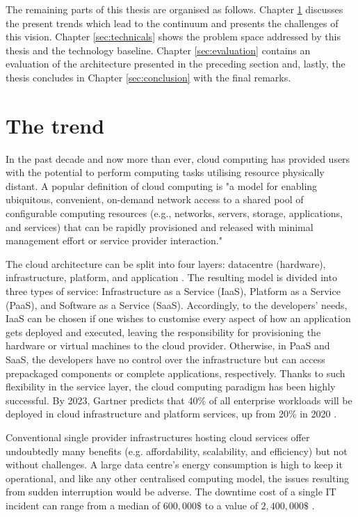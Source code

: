 The remaining parts of this thesis are organised as follows. Chapter \ref{sec:challenges} discusses the present trends which lead to the continuum and presents the challenges of this vision. Chapter \ref{sec:technicals} shows the problem space addressed by this thesis and the technology baseline. Chapter \ref{sec:evaluation} contains an evaluation of the architecture presented in the preceding section and, lastly, the thesis concludes in Chapter \ref{sec:conclusion} with the final remarks.

\section{The trend}
\label{sec:challenges}

In the past decade and now more than ever, cloud computing has provided users with the potential to perform computing tasks utilising resource physically distant. A popular definition of cloud computing \cite{cloud-def} is "a model for enabling ubiquitous, convenient, on-demand network access to a shared pool of configurable computing resources (e.g., networks, servers, storage, applications, and services) that can be rapidly provisioned and released with minimal management effort or service provider interaction."

The cloud architecture can be split into four layers: datacentre (hardware), infrastructure, platform, and application \cite{cloud-computing}. The resulting model is divided into three types of service: Infrastructure as a Service (IaaS), Platform as a Service (PaaS), and Software as a Service (SaaS). Accordingly, to the developers' needs, IaaS can be chosen if one wishes to customise every aspect of how an application gets deployed and executed, leaving the responsibility for provisioning the hardware or virtual machines to the cloud provider. Otherwise, in PaaS and SaaS, the developers have no control over the infrastructure but can access prepackaged components or complete applications, respectively. Thanks to such flexibility in the service layer, the cloud computing paradigm has been highly successful. By 2023, Gartner predicts that 40\% of all enterprise workloads will be deployed in cloud infrastructure and platform services, up from 20\% in 2020 \cite{gartner-cloud-edge}.

Conventional single provider infrastructures hosting cloud services offer undoubtedly many benefits (e.g. affordability, scalability, and efficiency) but not without challenges. A large data centre's energy consumption is high to keep it operational, and like any other centralised computing model, the issues resulting from sudden interruption would be adverse. The downtime cost of a single IT incident can range from a median of $600,000\$$ to a value of $2,400,000\$$ \cite{downtime-cost}.

